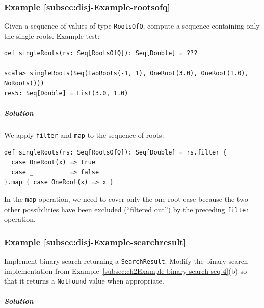 \subsubsection{Example \label{subsec:disj-Example-rootsofq}\ref{subsec:disj-Example-rootsofq}}

Given a sequence of values of type \lstinline!RootsOfQ!, compute
a sequence containing only the single roots. Example test:
\begin{lstlisting}
def singleRoots(rs: Seq[RootsOfQ]): Seq[Double] = ???

scala> singleRoots(Seq(TwoRoots(-1, 1), OneRoot(3.0), OneRoot(1.0), NoRoots()))
res5: Seq[Double] = List(3.0, 1.0) 
\end{lstlisting}


\subparagraph{Solution}

We apply \lstinline!filter! and \lstinline!map! to the sequence
of roots:
\begin{lstlisting}
def singleRoots(rs: Seq[RootsOfQ]): Seq[Double] = rs.filter {
  case OneRoot(x) => true
  case _          => false
}.map { case OneRoot(x) => x }
\end{lstlisting}
In the \lstinline!map! operation, we need to cover only the one-root
case because the two other possibilities have been excluded (\textsf{``}filtered
out\textsf{''}) by the preceding \lstinline!filter! operation.

\subsubsection{Example \label{subsec:disj-Example-searchresult}\ref{subsec:disj-Example-searchresult}}

Implement binary search returning a \lstinline!SearchResult!. Modify
the binary search implementation from Example~\ref{subsec:ch2Example-binary-search-seq-4}(b)
so that it returns a \lstinline!NotFound! value when appropriate.

\subparagraph{Solution}

